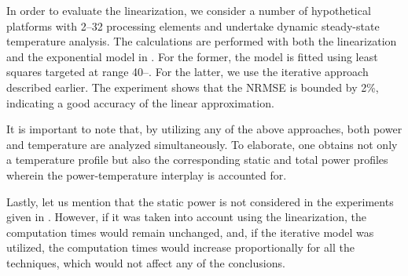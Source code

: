 In order to evaluate the linearization, we consider a number of hypothetical
platforms with 2--32 processing elements and undertake dynamic steady-state
temperature analysis. The calculations are performed with both the linearization
and the exponential model in . For the former, the model is
fitted using least squares \cite{press2007} targeted at range 40--.
For the latter, we use the iterative approach described earlier. The experiment
shows that the \ac{NRMSE} is bounded by 2\%, indicating a good accuracy of the
linear approximation.

It is important to note that, by utilizing any of the above approaches, both
power and temperature are analyzed simultaneously. To elaborate, one obtains not
only a temperature profile but also the corresponding static and total power
profiles wherein the power-temperature interplay is accounted for.

Lastly, let us mention that the static power is not considered in the
experiments given in . However, if it was
taken into account using the linearization, the computation times would remain
unchanged, and, if the iterative model was utilized, the computation times would
increase proportionally for all the techniques, which would not affect any of
the conclusions.
